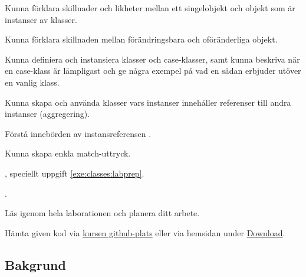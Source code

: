 

\Lab{\LabWeekSIX}

\begin{Goals}
\item Kunna förklara skillnader och likheter mellan ett singelobjekt och objekt som är instanser av klasser.
\item Kunna förklara skillnaden mellan förändringsbara och oföränderliga objekt.
\item Kunna definiera och instansiera klasser och case-klasser, samt kunna beskriva när en case-klass är lämpligast och ge några exempel på vad en sådan erbjuder utöver en vanlig klass.
\item Kunna skapa och använda klasser vars instanser innehåller referenser till andra instanser (aggregering).
\item Förstå innebörden av instansreferensen .
\item Kunna skapa enkla match-uttryck.
\end{Goals}

\begin{Preparations}
\item {}, speciellt uppgift \ref{exe:classes:labprep}.
\item {}.
\item Läs igenom hela laborationen och planera ditt arbete.
\item Hämta given kod via \href{https://github.com/lunduniversity/introprog/tree/master/workspace/}{kursen github-plats} eller via hemsidan under \href{https://cs.lth.se/pgk/download/}{Download}.

\end{Preparations}

\subsection{Bakgrund}

